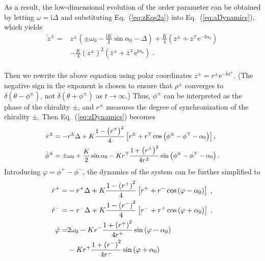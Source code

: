 \documentclass{article}
\begin{document}
As a result, the low-dimensional evolution of the order parameter can be obtained by letting $\omega =\mathrm{i}\Delta$ and substituting Eq.~(\ref{eq:zEqs2a}) into Eq.~(\ref{eq:aDynamics}), which yields
\begin{equation}
    \label{eq:zDynamics}
    \begin{aligned}
        \dot{z}^{\pm}=&z^{\pm}\left( \pm \omega _0-\frac{\mathrm{i}K}{2}\sin \alpha _0-\Delta \right)+\frac{K}{4}\left( z^{\pm}+z^{\mp}\mathrm{e}^{-\mathrm{i}\alpha _0} \right)\\
        &-\frac{K}{4}\left( z^{\pm} \right) ^2\left( \bar{z}^{\pm}+\bar{z}^{\mp}\mathrm{e}^{\mathrm{i}\alpha _0} \right) \;.\\
    \end{aligned}
\end{equation}

Then we rewrite the above equation using polar coordinates $z^{\pm}=r^{\pm}\mathrm{e}^{-\mathrm{i}\phi ^{\pm}}$. (The negative sign in the exponent is chosen to ensure that $\rho^{\pm}$ converges to $\delta\left(\theta-\phi^{\pm}\right)$, not $\delta\left(\theta+\phi^{\pm}\right)$ as $t\rightarrow\infty$.) Thus, $\phi^{\pm}$ can be interpreted as the phase of the chirality $\pm$, and $r^{\pm}$ measures the degree of synchronization of the chirality $\pm$. 
Then Eq.~(\ref{eq:zDynamics}) becomes
\begin{subequations}
    \small
    \begin{align}
        \dot{r}^{\pm}&=-r^{\pm}\Delta +K\frac{1 -\left( r^{\pm} \right) ^2}{4}\left[ r^{\pm}+r^{\mp}\cos \left( \phi ^{\pm}-\phi ^{\mp}-\alpha _0 \right) \right] ,\\
        \dot{\phi}^{\pm}&=\pm\omega_0+\frac{K}{2}\sin \alpha _0-Kr^{\mp}\frac{1+\left( r^{\pm} \right) ^2}{4r^{\pm}}\sin \left( \phi ^{\pm}-\phi ^{\mp}-\alpha _0 \right) .
    \end{align}
\end{subequations}
Introducing $\varphi=\phi^+-\phi^-$, the dynamics of the system can be further simplified to
\begin{subequations}
    \begin{align}
        \dot{r}^+=&-r^+\Delta +K\frac{1-\left( r^+ \right) ^2}{4}\left[ r^++r^-\cos \left( \varphi -\alpha _0 \right) \right] \;,\\
        \dot{r}^-=&-r^-\Delta +K\frac{1-\left( r^- \right) ^2}{4}\left[ r^-+r^+\cos \left( \varphi +\alpha _0 \right) \right] \;,\\
        \dot{\varphi}=&2\omega_0-Kr^-\frac{1+\left( r^+ \right) ^2}{4r^+}\sin \left( \varphi -\alpha _0 \right)\notag\\
        &-Kr^+\frac{1+\left( r^- \right) ^2}{4r^-}\sin \left( \varphi +\alpha _0 \right)
    \end{align}
\end{subequations}
\end{document}
